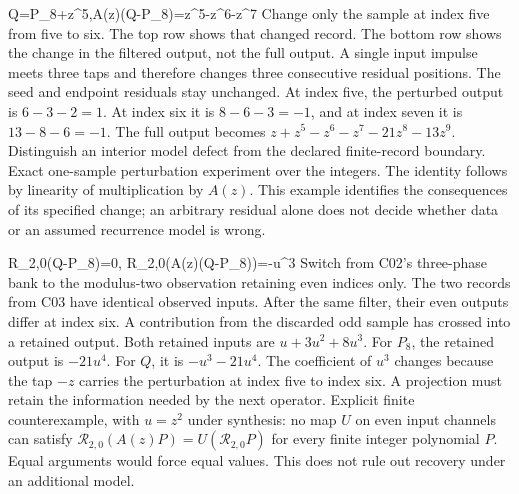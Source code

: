 {Q=P_8+z^5,\qquad A(z)(Q-P_8)=z^5-z^6-z^7}
{Change only the sample at index five from five to six. The top row shows that changed record. The bottom row shows the change in the filtered output, not the full output. A single input impulse meets three taps and therefore changes three consecutive residual positions. The seed and endpoint residuals stay unchanged.}
{At index five, the perturbed output is $6-3-2=1$. At index six it is $8-6-3=-1$, and at index seven it is $13-8-6=-1$. The full output becomes $z+z^5-z^6-z^7-21z^8-13z^9$.}
{Distinguish an interior model defect from the declared finite-record boundary.}
{Exact one-sample perturbation experiment over the integers. The identity follows by linearity of multiplication by $A(z)$. This example identifies the consequences of its specified change; an arbitrary residual alone does not decide whether data or an assumed recurrence model is wrong.}

{\mathcal R_{2,0}(Q-P_8)=0,\qquad
 \mathcal R_{2,0}\bigl(A(z)(Q-P_8)\bigr)=-u^3}
{Switch from C02's three-phase bank to the modulus-two observation retaining even indices only. The two records from C03 have identical observed inputs. After the same filter, their even outputs differ at index six. A contribution from the discarded odd sample has crossed into a retained output.}
{Both retained inputs are $u+3u^2+8u^3$. For $P_8$, the retained output is $-21u^4$. For $Q$, it is $-u^3-21u^4$. The coefficient of $u^3$ changes because the tap $-z$ carries the perturbation at index five to index six.}
{A projection must retain the information needed by the next operator.}
{Explicit finite counterexample, with $u=z^2$ under synthesis: no map $U$ on even input channels can satisfy $\mathcal R_{2,0}(A(z)P)=U(\mathcal R_{2,0}P)$ for every finite integer polynomial $P$. Equal arguments would force equal values. This does not rule out recovery under an additional model.}

